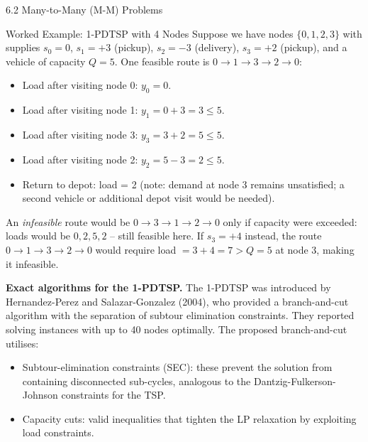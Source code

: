 \documentclass[aspectratio=169,10pt]{beamer}
\begin{document}
\begin{frame}[allowframebreaks]{6.2 Many-to-Many (M-M) Problems}
  \begin{exampleblock}{Worked Example: 1-PDTSP with 4 Nodes}
    Suppose we have nodes $\{0, 1, 2, 3\}$ with supplies $s_0 = 0$, $s_1 = +3$ (pickup),
    $s_2 = -3$ (delivery), $s_3 = +2$ (pickup), and a vehicle of capacity $Q = 5$.
    One feasible route is $0 \to 1 \to 3 \to 2 \to 0$:
    \begin{itemize}
      \item Load after visiting node 0: $y_0 = 0$.
      \item Load after visiting node 1: $y_1 = 0 + 3 = 3 \leq 5$. \checkmark
      \item Load after visiting node 3: $y_3 = 3 + 2 = 5 \leq 5$. \checkmark
      \item Load after visiting node 2: $y_2 = 5 - 3 = 2 \leq 5$. \checkmark
      \item Return to depot: load = 2 (note: demand at node 3 remains unsatisfied;
            a second vehicle or additional depot visit would be needed).
    \end{itemize}
    An \emph{infeasible} route would be $0 \to 3 \to 1 \to 2 \to 0$ only if capacity
    were exceeded: loads would be $0, 2, 5, 2$ -- still feasible here.  If $s_3 = +4$
    instead, the route $0 \to 1 \to 3 \to 2 \to 0$ would require load $= 3 + 4 = 7 > Q=5$
    at node 3, making it infeasible.
  \end{exampleblock}

  \framebreak

  \textbf{Exact algorithms for the 1-PDTSP.} The 1-PDTSP was introduced by Hernandez-Perez
  and Salazar-Gonzalez (2004), who provided a branch-and-cut algorithm with the separation
  of subtour elimination constraints.  They reported solving instances with up to 40 nodes
  optimally.  The proposed branch-and-cut utilises:
  \begin{itemize}
    \item Subtour-elimination constraints (SEC): these prevent the solution from containing
          disconnected sub-cycles, analogous to the Dantzig-Fulkerson-Johnson constraints
          for the TSP.
    \item Capacity cuts: valid inequalities that tighten the LP relaxation by exploiting
          load constraints.
  \end{itemize}


\end{frame}
\end{document}

